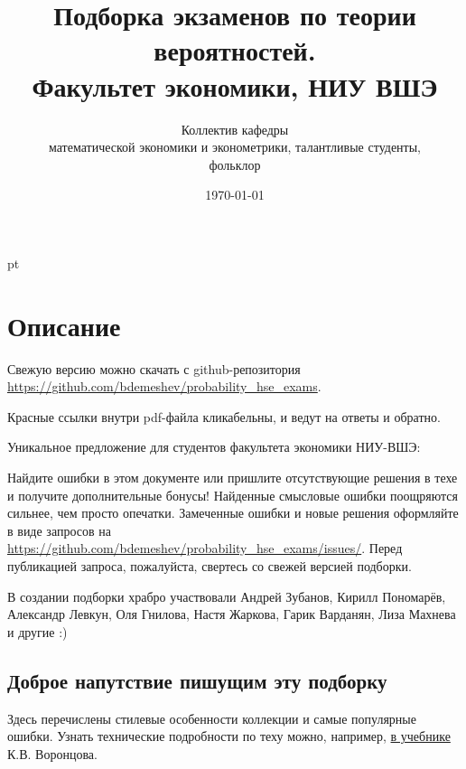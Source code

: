 \documentclass[11pt, a4paper]{article}
\title{Подборка экзаменов по теории вероятностей. \\Факультет экономики, НИУ ВШЭ}
\date{\today}
\author{Коллектив кафедры \\
математической экономики и эконометрики,
талантливые студенты,\\
 фольклор}
\theoremstyle{definition}
\begin{document}
\maketitle

\tableofcontents{}


 pt %

\clearpage
\section*{Описание}

Свежую версию можно скачать с github-репозитория \url{https://github.com/bdemeshev/probability_hse_exams}.

Красные ссылки внутри pdf-файла кликабельны, и ведут на ответы и обратно.


Уникальное предложение для студентов факультета экономики НИУ-ВШЭ:

Найдите ошибки в этом документе или пришлите отсутствующие решения в техе и получите
дополнительные бонусы!
Найденные смысловые ошибки поощряются сильнее, чем просто опечатки.
Замеченные ошибки и новые решения оформляйте в виде запросов на
\url{https://github.com/bdemeshev/probability_hse_exams/issues/}.
Перед публикацией запроса, пожалуйста, свертесь со свежей версией подборки.

В создании подборки храбро участвовали
Андрей Зубанов, Кирилл Пономарёв, Александр Левкун, Оля Гнилова,
Настя Жаркова, Гарик Варданян, Лиза Махнева и другие :)


\subsection*{Доброе напутствие пишущим эту подборку}

Здесь перечислены стилевые особенности коллекции и самые популярные ошибки.
Узнать технические подробности по теху можно, например,
\href{http://www.ccas.ru/voron/download/voron05latex.pdf}{в учебнике} К.В. Воронцова.
\end{document}
